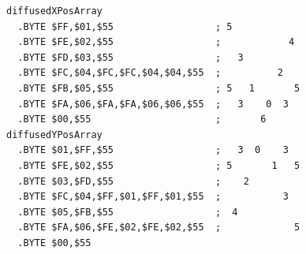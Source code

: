 \begin{minipage}[b]{0.48\linewidth}
\begin{lrbox}{\mybox}%
\begin{lstlisting}[basicstyle=\ttfamily\tiny]
diffusedXPosArray
  .BYTE $FF,$01,$55                  ; 5            
  .BYTE $FE,$02,$55                  ;            4 
  .BYTE $FD,$03,$55                  ;   3          
  .BYTE $FC,$04,$FC,$FC,$04,$04,$55  ;          2   
  .BYTE $FB,$05,$55                  ; 5   1       5
  .BYTE $FA,$06,$FA,$FA,$06,$06,$55  ;   3    0  3  
  .BYTE $00,$55                      ;       6      
diffusedYPosArray
  .BYTE $01,$FF,$55                  ;   3  0    3  
  .BYTE $FE,$02,$55                  ; 5       1   5
  .BYTE $03,$FD,$55                  ;    2         
  .BYTE $FC,$04,$FF,$01,$FF,$01,$55  ;           3  
  .BYTE $05,$FB,$55                  ;  4           
  .BYTE $FA,$06,$FE,$02,$FE,$02,$55  ;             5
  .BYTE $00,$55
\end{lstlisting}
\end{lrbox}%
\scalebox{0.8}{\usebox{\mybox}}

\end{minipage}
